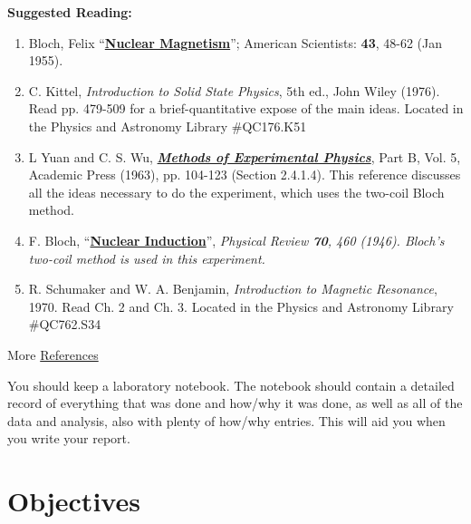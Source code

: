 \documentclass{../lab}
\begin{document}
\textbf{Suggested Reading:}

\begin{enumerate}
    \item Bloch, Felix ``\href{http://physics111.lib.berkeley.edu/Physics111/Reprints/NMR/02-Nuclear\_Magnetism.pdf}{\textbf{Nuclear Magnetism}}''; American Scientists: \textbf{43}, 48-62 (Jan 1955).

    \item C. Kittel, \emph{Introduction to Solid State Physics}, 5th ed., John Wiley (1976). Read pp. 479-509 for a brief-quantitative expose of the main ideas. Located in the Physics and Astronomy Library \#QC176.K51

    \item L Yuan and C. S. Wu, \emph{\href{http://physics111.lib.berkeley.edu/Physics111/Reprints/NMR/01-Methods\_of\_Experimental\_Physics.pdf}{\textbf{Methods of Experimental Physics}}}, Part B, Vol. 5, Academic Press (1963), pp. 104-123 (Section 2.4.1.4). This reference discusses all the ideas necessary to do the experiment, which uses the two-coil Bloch method.

    \item F. Bloch, ``\href{http://physics111.lib.berkeley.edu/Physics111/Reprints/NMR/03-Nuclear_Induction.pdf}{\textbf{Nuclear Induction}}'', \emph{Physical Review \textbf{70}, 460 (1946). Bloch's two-coil method is used in this experiment. }

    \item R. Schumaker and W. A. Benjamin, \emph{Introduction to Magnetic Resonance}, 1970. Read Ch. 2 and Ch. 3. Located in the Physics and Astronomy Library \#QC762.S34
\end{enumerate}

More \hyperref[References]{References}

You should keep a laboratory notebook. The notebook should contain a detailed record of everything that was done and how/why it was done, as well as all of the data and analysis, also with plenty of how/why entries. This will aid you when you write your report.

\section{Objectives}
\end{document}
